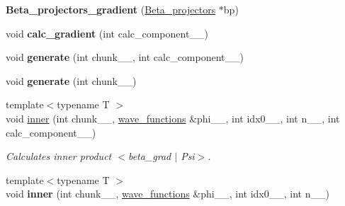\begin{DoxyCompactItemize}
\item 
\hypertarget{classsirius_1_1_beta__projectors__gradient_a3ea5e78a500e774f10557fc1bf7f5bdd}{}{\bfseries Beta\+\_\+projectors\+\_\+gradient} (\hyperlink{classsirius_1_1_beta__projectors}{Beta\+\_\+projectors} $\ast$bp)\label{classsirius_1_1_beta__projectors__gradient_a3ea5e78a500e774f10557fc1bf7f5bdd}

\item 
\hypertarget{classsirius_1_1_beta__projectors__gradient_ad9218f4e33cd4e59fe564b9ae40f6c07}{}void {\bfseries calc\+\_\+gradient} (int calc\+\_\+component\+\_\+\+\_\+)\label{classsirius_1_1_beta__projectors__gradient_ad9218f4e33cd4e59fe564b9ae40f6c07}

\item 
\hypertarget{classsirius_1_1_beta__projectors__gradient_ab05187d4aeeadf3bae6adc5c37e5f84f}{}void {\bfseries generate} (int chunk\+\_\+\+\_\+, int calc\+\_\+component\+\_\+\+\_\+)\label{classsirius_1_1_beta__projectors__gradient_ab05187d4aeeadf3bae6adc5c37e5f84f}

\item 
\hypertarget{classsirius_1_1_beta__projectors__gradient_a8c3f777290fcc482f764527695c1565e}{}void {\bfseries generate} (int chunk\+\_\+\+\_\+)\label{classsirius_1_1_beta__projectors__gradient_a8c3f777290fcc482f764527695c1565e}

\item 
{\footnotesize template$<$typename T $>$ }\\void \hyperlink{classsirius_1_1_beta__projectors__gradient_a4398ace6a54a93c8cda973967de61b56}{inner} (int chunk\+\_\+\+\_\+, \hyperlink{classsddk_1_1wave__functions}{wave\+\_\+functions} \&phi\+\_\+\+\_\+, int idx0\+\_\+\+\_\+, int n\+\_\+\+\_\+, int calc\+\_\+component\+\_\+\+\_\+)
\begin{DoxyCompactList}\small\item\em Calculates inner product $<$beta\+\_\+grad $\vert$ Psi$>$. \end{DoxyCompactList}\item 
\hypertarget{classsirius_1_1_beta__projectors__gradient_abdce8a4f5e1be9b9e13c40838363a36e}{}{\footnotesize template$<$typename T $>$ }\\void {\bfseries inner} (int chunk\+\_\+\+\_\+, \hyperlink{classsddk_1_1wave__functions}{wave\+\_\+functions} \&phi\+\_\+\+\_\+, int idx0\+\_\+\+\_\+, int n\+\_\+\+\_\+)\label{classsirius_1_1_beta__projectors__gradient_abdce8a4f5e1be9b9e13c40838363a36e}


\end{DoxyCompactItemize}
